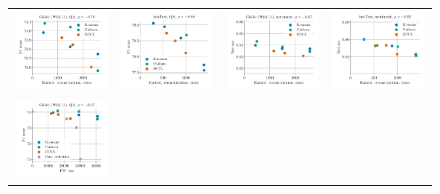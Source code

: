 \begin{figure}
	\centering
	\begin{tabular}{@{\hskip -0.0in}c@{\hskip -0.0in}c@{\hskip -0.0in}c@{\hskip -0.0in}c@{\hskip -0.0in}}
		\includegraphics[width=.245\linewidth]{figures/glove400k_qa_best-f1_vs_embed-frob-error_linx_det_ave-pt.pdf} &
		\includegraphics[width=.245\linewidth]{figures/fasttext1m_qa_best-f1_vs_embed-frob-error_linx_det_ave-pt.pdf} &
		\includegraphics[width=.245\linewidth]{figures/glove400k_sentiment_sst_test-acc_vs_embed-frob-error_linx_det_ave-pt.pdf} &
		\includegraphics[width=.245\linewidth]{figures/fasttext1m_sentiment_sst_test-acc_vs_embed-frob-error_linx_det_ave-pt.pdf} \\
		\includegraphics[width=.245\linewidth]{figures/glove400k_qa_best-f1_vs_gram-large-dim-frob-error_linx_det_ave-pt.pdf} &

\end{tabular}
\end{figure}
